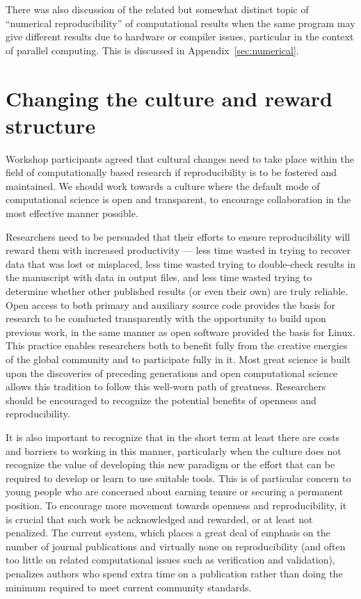\documentclass[11pt]{article}
\begin{document}
There was also discussion of
the related but somewhat distinct topic of ``numerical reproducibility''
of computational results when the same program may give different results
due to hardware or compiler issues, particular in the context of parallel 
computing.  This is discussed in Appendix~\ref{sec:numerical}.

\section{Changing the culture and reward structure} \label{sec:rewards}

Workshop participants agreed that cultural changes need to take
place within the field of computationally based research if
reproducibility is to be fostered and maintained.  We should work
towards a culture where the default mode of computational science
is open and transparent, to encourage collaboration in the most
effective manner possible.

Researchers need to be persuaded that their efforts to ensure
reproducibility will reward them with increased productivity --- less time
wasted in trying to recover data that was lost or misplaced, less time
wasted trying to double-check results in the manuscript with data in output
files, and less time wasted trying to determine whether other published
results (or even their own) are truly reliable.  Open access to both primary
and auxiliary source code provides the basis for research to be conducted
transparently with the opportunity to build upon previous work, in the same
manner as open software provided the basis for Linux.  This practice enables
researchers both to benefit fully from the creative energies of the global
community and to participate fully in it.  Most great science is built upon
the discoveries of preceding generations and open computational science
allows this tradition to follow this well-worn path of greatness.  
Researchers should be encouraged to recognize the potential benefits of
openness and reproducibility.

It is also important to recognize that in the short term at least there are
costs and barriers to working in this manner, particularly when the culture
does not recognize the value of developing this new paradigm or the effort
that can be required to develop or learn to use suitable tools.
This is of particular concern to young people who are concerned about
earning tenure or securing a permanent position.   To encourage more movement
towards openness and reproducibility, it is crucial that such work be
acknowledged and rewarded, or at least not penalized.  The current system,
which places a great deal of emphasis on the number of journal publications 
and virtually none on reproducibility (and often too little on 
related computational issues such as verification and validation), penalizes
authors who spend extra time on a publication rather than doing the minimum
required to meet current community standards.  
\end{document}
